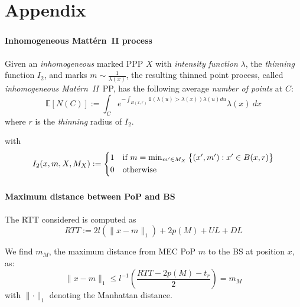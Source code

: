 \documentclass[aspectratio=169]{beamer}
\begin{document}
\section*{Appendix}
\begin{frame}
    \frametitle{\secname}
    \framesubtitle{Inhomogeneous Mattérn~II process}
    \begin{lemma}
    Given an \emph{inhomogeneous} marked PPP $X$ with \emph{intensity function} $\lambda$, the \emph{thinning} function $I_2$, and marks $m \sim \frac{1}{\lambda(x)}$, the resulting thinned point process, called \emph{inhomogeneous Mat\'ern~II}~PP, has the following average \emph{number of points} at $C$:
        \begin{equation}
            \mathbb{E}\left[ N(C) \right] := \int_C e^{-\int_{B(x,r)} \mathds{1}\left(\lambda(u) > \lambda(x) \right) \lambda(u) du} \lambda(x)\ dx
            \label{eq:inh-matern2-avg}
        \end{equation}
        where $r$ is the \emph{thinning} radius of $I_2$.
        \label{prop:inh-matern2-avg}
    \end{lemma}



    \vfill
    with
    \begin{equation}
        I_2(x,m, X, M_X) := \begin{cases*}
            1 & if $m = \min_{m' \in M_X}\big\{ (x',m'): x'\in B(x,r) \big\}$\\
            0 & otherwise
        \end{cases*}
        \label{eq:matern2}
    \end{equation}

\end{frame}





\begin{frame}
    \frametitle{\secname}
    \framesubtitle{Maximum distance between PoP and BS}


    The RTT considered is computed as
    \begin{equation}
        RTT := 2 l\left(\lVert x - m \rVert_1 \right) + 2 p(M) + UL + DL
        \label{eq:rtt}
    \end{equation}


    We find $m_M$, the maximum distance from MEC PoP $m$ to the BS at position $x$, as:
    \begin{equation}
        \lVert x-m \rVert_1 \le l^{-1}\left( \frac{RTT - 2p(M) - t_r}{2} \right)  = m_M
        \label{eq:max-dis}
    \end{equation}
    with $\lVert \cdot \rVert_1$ denoting the Manhattan distance.
\end{frame}
\end{document}
